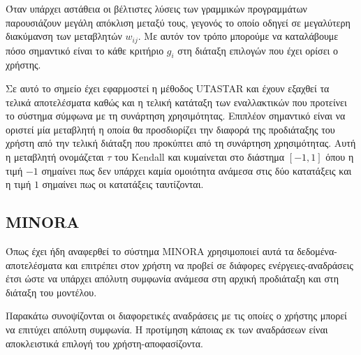 \documentclass[11pt,a4paper,titlepage]{article}
\numberwithin{equation}{section}
\begin{document}
Όταν υπάρχει αστάθεια οι βέλτιστες λύσεις των γραμμικών προγραμμάτων παρουσιάζουν μεγάλη απόκλιση μεταξύ τους, γεγονός το οποίο οδηγεί σε μεγαλύτερη διακύμανση των μεταβλητών $w_{ij}$. Με αυτόν τον τρόπο μπορούμε να καταλάβουμε πόσο σημαντικό είναι το κάθε κριτήριο $g_{i}$ στη διάταξη επιλογών που έχει ορίσει ο χρήστης.

Σε αυτό το σημείο έχει εφαρμοστεί η μέθοδος UTASTAR και έχουν εξαχθεί τα τελικά αποτελέσματα καθώς και η τελική κατάταξη των εναλλακτικών που προτείνει το σύστημα σύμφωνα με τη συνάρτηση χρησιμότητας.
Επιπλέον σημαντικό είναι να οριστεί μία μεταβλητή η οποία θα προσδιορίζει την διαφορά της προδιάταξης του χρήστη από την τελική διάταξη που προκύπτει από τη συνάρτηση χρησιμότητας. Αυτή η μεταβλητή ονομάζεται $τ$ του Kendall και κυμαίνεται στο διάστημα $[-1,1]$ όπου η τιμή $-1$ σημαίνει πως δεν υπάρχει καμία ομοιότητα ανάμεσα στις δύο κατατάξεις και η τιμή $1$ σημαίνει πως οι κατατάξεις ταυτίζονται.

\subsection{MINORA}
\label{ssec:minora-theory}
Όπως έχει ήδη αναφερθεί το σύστημα MINORA χρησιμοποιεί αυτά τα δεδομένα-αποτελέσματα και επιτρέπει στον χρήστη να προβεί σε διάφορες ενέργειες-αναδράσεις έτσι ώστε να υπάρχει απόλυτη συμφωνία ανάμεσα στη αρχική προδιάταξη και στη διάταξη του μοντέλου.

Παρακάτω συνοψίζονται οι διαφορετικές αναδράσεις με τις οποίες ο χρήστης μπορεί να επιτύχει απόλυτη συμφωνία. Η προτίμηση κάποιας εκ των αναδράσεων είναι αποκλειστικά επιλογή του χρήστη-αποφασίζοντα.
\end{document}
